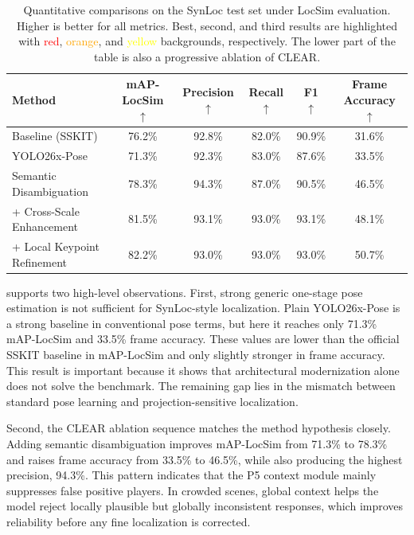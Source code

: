 \documentclass[runningheads]{llncs}
\begin{document}
\begin{table}[t]
    \centering
    \setlength{\tabcolsep}{7pt}
    \caption{Quantitative comparisons on the SynLoc test set under LocSim evaluation. Higher is better for all metrics. Best, second, and third results are highlighted with \textcolor{red}{red}, \textcolor{orange}{orange}, and \textcolor{yellow}{yellow} backgrounds, respectively. The lower part of the table is also a progressive ablation of CLEAR.}
    \label{tab:locsim_main_results}
    \begin{tabular}{lccccc}
        \toprule
        Method & mAP-LocSim $\uparrow$ & Precision $\uparrow$ & Recall $\uparrow$ & F1 $\uparrow$ & Frame Accuracy $\uparrow$ \\
        \midrule
        Baseline (SSKIT) & 76.2\% & 92.8\% & \cellcolor{yellow!35}82.0\% & \cellcolor{yellow!35}90.9\% & 31.6\% \\
        YOLO26x-Pose & 71.3\% & 92.3\% & 83.0\% & 87.6\% & 33.5\% \\
        \midrule
        Semantic Disambiguation & \cellcolor{yellow!35}78.3\% & \cellcolor{red!25}94.3\% & \cellcolor{orange!35}87.0\% & 90.5\% & \cellcolor{yellow!35}46.5\% \\
        + Cross-Scale Enhancement & \cellcolor{orange!35}81.5\% & \cellcolor{orange!35}93.1\% & \cellcolor{red!25}93.0\% & \cellcolor{red!25}93.1\% & \cellcolor{orange!35}48.1\% \\
        + Local Keypoint Refinement & \cellcolor{red!25}82.2\% & \cellcolor{yellow!35}93.0\% & \cellcolor{red!25}93.0\% & \cellcolor{orange!35}93.0\% & \cellcolor{red!25}50.7\% \\
        \bottomrule
    \end{tabular}
\end{table}

 supports two high-level observations. First, strong generic one-stage pose estimation is not sufficient for SynLoc-style localization. Plain YOLO26x-Pose is a strong baseline in conventional pose terms, but here it reaches only 71.3\% mAP-LocSim and 33.5\% frame accuracy. These values are lower than the official SSKIT baseline in mAP-LocSim and only slightly stronger in frame accuracy. This result is important because it shows that architectural modernization alone does not solve the benchmark. The remaining gap lies in the mismatch between standard pose learning and projection-sensitive localization.

Second, the CLEAR ablation sequence matches the method hypothesis closely. Adding semantic disambiguation improves mAP-LocSim from 71.3\% to 78.3\% and raises frame accuracy from 33.5\% to 46.5\%, while also producing the highest precision, 94.3\%. This pattern indicates that the P5 context module mainly suppresses false positive players. In crowded scenes, global context helps the model reject locally plausible but globally inconsistent responses, which improves reliability before any fine localization is corrected.
\end{document}
